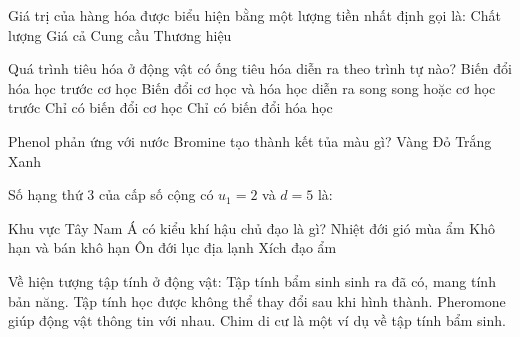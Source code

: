 \begin{ex}
    Giá trị của hàng hóa được biểu hiện bằng một lượng tiền nhất định gọi là:
    \choice
    {Chất lượng}
    {\True Giá cả}
    {Cung cầu}
    {Thương hiệu}
\end{ex}

\begin{ex}
    Quá trình tiêu hóa ở động vật có ống tiêu hóa diễn ra theo trình tự nào?
    \choice
    {Biến đổi hóa học trước cơ học}
    {\True Biến đổi cơ học và hóa học diễn ra song song hoặc cơ học trước}
    {Chỉ có biến đổi cơ học}
    {Chỉ có biến đổi hóa học}
\end{ex}

\begin{ex}
    Phenol phản ứng với nước Bromine tạo thành kết tủa màu gì?
    \choice
    {Vàng}
    {Đỏ}
    {\True Trắng}
    {Xanh}
\end{ex}

\begin{ex}
    Số hạng thứ 3 của cấp số cộng có $u_1=2$ và $d=5$ là:
\end{ex}

\begin{ex}
    Khu vực Tây Nam Á có kiểu khí hậu chủ đạo là gì?
    \choice
    {Nhiệt đới gió mùa ẩm}
    {\True Khô hạn và bán khô hạn}
    {Ôn đới lục địa lạnh}
    {Xích đạo ẩm}
\end{ex}

\begin{ex}
    Về hiện tượng tập tính ở động vật:
    \choiceTF
    {\True Tập tính bẩm sinh sinh ra đã có, mang tính bản năng.}
    {Tập tính học được không thể thay đổi sau khi hình thành.}
    {\True Pheromone giúp động vật thông tin với nhau.}
    {\True Chim di cư là một ví dụ về tập tính bẩm sinh.}
\end{ex}

